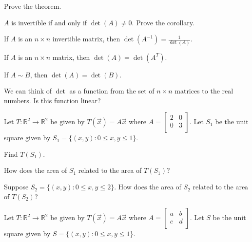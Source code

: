 \documentclass[12pt,letterpaper]{article}
\begin{document}
\begin{enumerate}



\Problem Prove the theorem.

\vfill
\vfill

 $A$ is invertible if and only if $\operatorname{det}(A)\neq0$. Prove the corollary.

\vfill

\newpage


\Part If $A$ is an $n\times n$ invertible matrix, then $\operatorname{det}(A^{-1})=\frac{1}{\operatorname{det}(A)}$.

\vfill

\Part If $A$ is an $n\times n$ matrix, then $\operatorname{det}(A)=\operatorname{det}(A^{T})$.

\vfill

\Part If $A \sim B$, then $\operatorname{det}(A)=\operatorname{det}(B)$.

\vfill

\Problem We can think of $\operatorname{det}$ as a function from the set of $n\times n$ matrices to the real numbers. Is this function linear?

\vfill

\newpage


\Problem Let $T:\mathbb{R}^2 \to \mathbb{R}^2$ be given by $T(\vec{x})=A\vec{x}$ where $A=\begin{bmatrix} 2 & 0\\ 0 & 3\\ \end{bmatrix}$. Let $S_1$ be the unit square given by $S_1=\{(x,y) : 0\leq x, y \leq 1\}$. 

\Part Find $T(S_1)$.

\vfill

\Part How does the area of $S_1$ related to the area of $T(S_1)$?

\vfill

\Part Suppose $S_2=\{(x,y) : 0\leq x, y \leq 2\}$. How does the area of $S_2$ related to the area of $T(S_2)$?

\vfill

\newpage

\Problem Let $T:\mathbb{R}^2 \to \mathbb{R}^2$ be given by $T(\vec{x})=A\vec{x}$ where $A=\begin{bmatrix} a & b\\ c & d\\ \end{bmatrix}$. Let $S$ be the unit square given by $S=\{(x,y) : 0\leq x, y \leq 1\}$. 


\end{enumerate}
\end{document}
